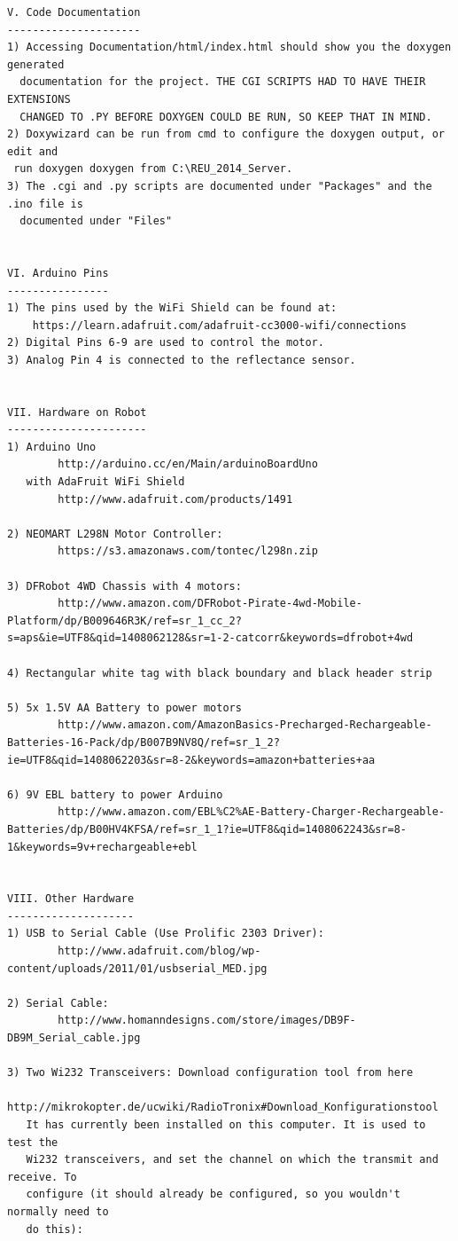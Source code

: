 \documentclass[english]{article}\usepackage[]{graphicx}\usepackage[]{color}
\begin{document}
\begin{verbatim}
V. Code Documentation
---------------------
1) Accessing Documentation/html/index.html should show you the doxygen generated
  documentation for the project. THE CGI SCRIPTS HAD TO HAVE THEIR EXTENSIONS
  CHANGED TO .PY BEFORE DOXYGEN COULD BE RUN, SO KEEP THAT IN MIND. 
2) Doxywizard can be run from cmd to configure the doxygen output, or edit and
 run doxygen doxygen from C:\REU_2014_Server.
3) The .cgi and .py scripts are documented under "Packages" and the .ino file is
  documented under "Files"


VI. Arduino Pins
----------------
1) The pins used by the WiFi Shield can be found at:
	https://learn.adafruit.com/adafruit-cc3000-wifi/connections
2) Digital Pins 6-9 are used to control the motor.
3) Analog Pin 4 is connected to the reflectance sensor.


VII. Hardware on Robot
----------------------
1) Arduino Uno
		http://arduino.cc/en/Main/arduinoBoardUno
   with AdaFruit WiFi Shield
   		http://www.adafruit.com/products/1491

2) NEOMART L298N Motor Controller:
		https://s3.amazonaws.com/tontec/l298n.zip

3) DFRobot 4WD Chassis with 4 motors:
  		http://www.amazon.com/DFRobot-Pirate-4wd-Mobile-Platform/dp/B009646R3K/ref=sr_1_cc_2?s=aps&ie=UTF8&qid=1408062128&sr=1-2-catcorr&keywords=dfrobot+4wd

4) Rectangular white tag with black boundary and black header strip

5) 5x 1.5V AA Battery to power motors
		http://www.amazon.com/AmazonBasics-Precharged-Rechargeable-Batteries-16-Pack/dp/B007B9NV8Q/ref=sr_1_2?ie=UTF8&qid=1408062203&sr=8-2&keywords=amazon+batteries+aa

6) 9V EBL battery to power Arduino
		http://www.amazon.com/EBL%C2%AE-Battery-Charger-Rechargeable-Batteries/dp/B00HV4KFSA/ref=sr_1_1?ie=UTF8&qid=1408062243&sr=8-1&keywords=9v+rechargeable+ebl


VIII. Other Hardware
--------------------
1) USB to Serial Cable (Use Prolific 2303 Driver):
		http://www.adafruit.com/blog/wp-content/uploads/2011/01/usbserial_MED.jpg

2) Serial Cable:
		http://www.homanndesigns.com/store/images/DB9F-DB9M_Serial_cable.jpg

3) Two Wi232 Transceivers: Download configuration tool from here
		http://mikrokopter.de/ucwiki/RadioTronix#Download_Konfigurationstool
   It has currently been installed on this computer. It is used to test the 
   Wi232 transceivers, and set the channel on which the transmit and receive. To
   configure (it should already be configured, so you wouldn't normally need to
   do this):


\end{verbatim}
\end{document}
